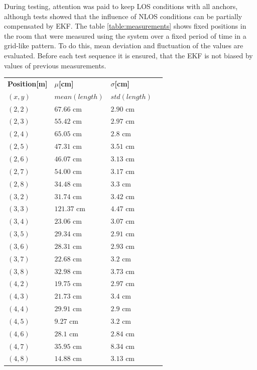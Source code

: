 \documentclass[conference, a4paper]{IEEEtran}
\begin{document}
During testing, attention was paid to keep \ac{LOS} conditions with all anchors,
although tests showed that the influence of \ac{NLOS} conditions can be partially compensated by \ac{EKF}.
The table \ref{table:measurements} shows fixed positions in the room that were measured using the system
over a fixed period of time in a grid-like pattern. 
To do this, mean deviation and fluctuation of the values are evaluated. 
Before each test sequence it is ensured, that the \ac{EKF} is not biased by values of previous measurements. 

\begin{table}[hbt!]
	\centering
	\begin{tabular}{l l l c}
		\textbf{Position[m]} & \textbf{$\mu$[cm]} & \textbf{$\sigma$[cm]}\\
		$(x,y)$ & $mean(length)$ & $std(length)$\\
		$(2,2)$ & $67.66$ cm & $2.90$ cm\\
		$(2,3)$ & $55.42$ cm & $2.97$ cm\\
		$(2,4)$ & $65.05$ cm & $2.8$ cm\\
		$(2,5)$ & $47.31$ cm & $3.51$ cm\\
		$(2,6)$ & $46.07$ cm & $3.13$ cm\\
		$(2,7)$ & $54.00$ cm & $3.17$ cm\\
		$(2,8)$ & $34.48$ cm & $3.3$ cm\\

		$(3,2)$ & $31.74$ cm & $3.42$ cm\\
		$(3,3)$ & $121.37$ cm & $4.47$ cm\\
		$(3,4)$ & $23.06$ cm & $3.07$ cm\\
		$(3,5)$ & $29.34$ cm & $2.91$ cm\\
		$(3,6)$ & $28.31$ cm & $2.93$ cm\\
		$(3,7)$ & $22.68$ cm & $3.2$ cm\\
		$(3,8)$ & $32.98$ cm & $3.73$ cm\\

		$(4,2)$ & $19.75$ cm & $2.97$ cm\\
		$(4,3)$ & $21.73$ cm & $3.4$ cm\\
		$(4,4)$ & $29.91$ cm & $2.9$ cm\\
		$(4,5)$ & $9.27$ cm & $3.2$ cm\\
		$(4,6)$ & $28.1$ cm & $2.84$ cm\\
		$(4,7)$ & $35.95$ cm & $8.34$ cm\\
		$(4,8)$ & $14.88$ cm & $3.13$ cm\\


\end{tabular}
\end{table}
\end{document}
